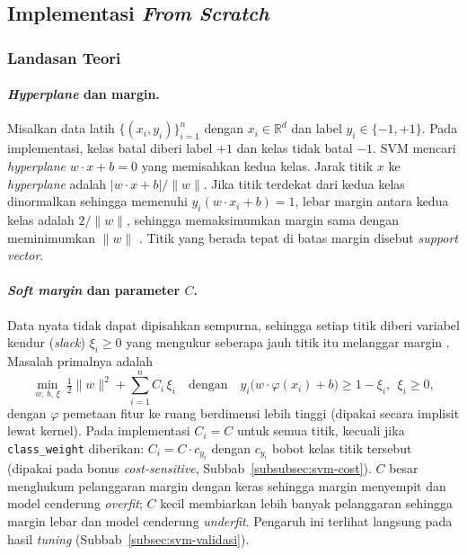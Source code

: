 \subsection{Implementasi \textit{From Scratch}}
\label{subsec:svm-implementasi}

\subsubsection{Landasan Teori}

\paragraph{\textit{Hyperplane} dan margin.} Misalkan data latih $\{(x_i, y_i)\}_{i=1}^{n}$ dengan $x_i \in \mathbb{R}^d$ dan label $y_i \in \{-1, +1\}$. Pada implementasi, kelas batal diberi label $+1$ dan kelas tidak batal $-1$. SVM mencari \textit{hyperplane} $w \cdot x + b = 0$ yang memisahkan kedua kelas. Jarak titik $x$ ke \textit{hyperplane} adalah $|w \cdot x + b| / \lVert w\rVert$. Jika titik terdekat dari kedua kelas dinormalkan sehingga memenuhi $y_i(w \cdot x_i + b) = 1$, lebar margin antara kedua kelas adalah $2 / \lVert w\rVert$, sehingga memaksimumkan margin sama dengan meminimumkan $\lVert w\rVert$ \cite{ruskanda-svm-what,ruskanda-svm-linear}. Titik yang berada tepat di batas margin disebut \textit{support vector}.

\paragraph{\textit{Soft margin} dan parameter $C$.} Data nyata tidak dapat dipisahkan sempurna, sehingga setiap titik diberi variabel kendur (\textit{slack}) $\xi_i \ge 0$ yang mengukur seberapa jauh titik itu melanggar margin \cite{ruskanda-svm-nonlinear}. Masalah primalnya adalah
\begin{equation}
	\min_{w,\,b,\,\xi}\ \tfrac{1}{2}\lVert w\rVert^2 + \sum_{i=1}^{n} C_i\,\xi_i
	\quad \text{dengan} \quad y_i\big(w \cdot \varphi(x_i) + b\big) \ge 1 - \xi_i,\ \ \xi_i \ge 0,
	\label{eq:svm-primal}
\end{equation}
dengan $\varphi$ pemetaan fitur ke ruang berdimensi lebih tinggi (dipakai secara implisit lewat kernel). Pada implementasi $C_i = C$ untuk semua titik, kecuali jika \texttt{class\_weight} diberikan: $C_i = C \cdot c_{y_i}$ dengan $c_{y_i}$ bobot kelas titik tersebut (dipakai pada bonus \textit{cost-sensitive}, Subbab~\ref{subsubsec:svm-cost}). $C$ besar menghukum pelanggaran margin dengan keras sehingga margin menyempit dan model cenderung \textit{overfit}; $C$ kecil membiarkan lebih banyak pelanggaran sehingga margin lebar dan model cenderung \textit{underfit}. Pengaruh ini terlihat langsung pada hasil \textit{tuning} (Subbab~\ref{subsec:svm-validasi}).

